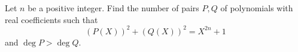 Let $n$ be a positive integer. Find the number of pairs $P, Q$ of
polynomials with real coefficients such that
\[
(P(X))^2 + (Q(X))^2 = X^{2n} + 1
\]
and $\deg P > \deg Q$.
